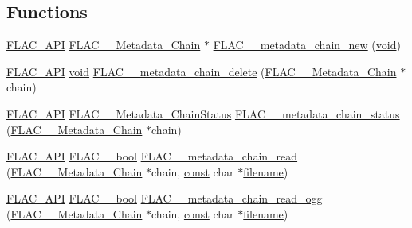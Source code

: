 \subsection*{Functions}
\begin{DoxyCompactItemize}
\item 
\hyperlink{group__flac__export_ga56ca07df8a23310707732b1c0007d6f5}{F\+L\+A\+C\+\_\+\+A\+PI} \hyperlink{struct_f_l_a_c_____metadata___chain}{F\+L\+A\+C\+\_\+\+\_\+\+Metadata\+\_\+\+Chain} $\ast$ \hyperlink{group__flac__metadata__level2_gafd1f4f58af29325b067ebc5dc34a0f69}{F\+L\+A\+C\+\_\+\+\_\+metadata\+\_\+chain\+\_\+new} (\hyperlink{sound_8c_ae35f5844602719cf66324f4de2a658b3}{void})
\item 
\hyperlink{group__flac__export_ga56ca07df8a23310707732b1c0007d6f5}{F\+L\+A\+C\+\_\+\+A\+PI} \hyperlink{sound_8c_ae35f5844602719cf66324f4de2a658b3}{void} \hyperlink{group__flac__metadata__level2_ga178898eef72ba9d569b1964fffcb4a8b}{F\+L\+A\+C\+\_\+\+\_\+metadata\+\_\+chain\+\_\+delete} (\hyperlink{struct_f_l_a_c_____metadata___chain}{F\+L\+A\+C\+\_\+\+\_\+\+Metadata\+\_\+\+Chain} $\ast$chain)
\item 
\hyperlink{group__flac__export_ga56ca07df8a23310707732b1c0007d6f5}{F\+L\+A\+C\+\_\+\+A\+PI} \hyperlink{group__flac__metadata__level2_gafe2a924893b0800b020bea8160fd4531}{F\+L\+A\+C\+\_\+\+\_\+\+Metadata\+\_\+\+Chain\+Status} \hyperlink{group__flac__metadata__level2_ga3d030e216a6517f23372bb76f0639127}{F\+L\+A\+C\+\_\+\+\_\+metadata\+\_\+chain\+\_\+status} (\hyperlink{struct_f_l_a_c_____metadata___chain}{F\+L\+A\+C\+\_\+\+\_\+\+Metadata\+\_\+\+Chain} $\ast$chain)
\item 
\hyperlink{group__flac__export_ga56ca07df8a23310707732b1c0007d6f5}{F\+L\+A\+C\+\_\+\+A\+PI} \hyperlink{ordinals_8h_a95103469f1cbd78b8cf250194985b34e}{F\+L\+A\+C\+\_\+\+\_\+bool} \hyperlink{group__flac__metadata__level2_gadb7d8e9a82aeb43e256f0a948adf5c45}{F\+L\+A\+C\+\_\+\+\_\+metadata\+\_\+chain\+\_\+read} (\hyperlink{struct_f_l_a_c_____metadata___chain}{F\+L\+A\+C\+\_\+\+\_\+\+Metadata\+\_\+\+Chain} $\ast$chain, \hyperlink{getopt1_8c_a2c212835823e3c54a8ab6d95c652660e}{const} char $\ast$\hyperlink{test__portburn_8cpp_a7efa5e9c7494c7d4586359300221aa5d}{filename})
\item 
\hyperlink{group__flac__export_ga56ca07df8a23310707732b1c0007d6f5}{F\+L\+A\+C\+\_\+\+A\+PI} \hyperlink{ordinals_8h_a95103469f1cbd78b8cf250194985b34e}{F\+L\+A\+C\+\_\+\+\_\+bool} \hyperlink{group__flac__metadata__level2_gae7b34f2929bedea0e14ac14aca253a40}{F\+L\+A\+C\+\_\+\+\_\+metadata\+\_\+chain\+\_\+read\+\_\+ogg} (\hyperlink{struct_f_l_a_c_____metadata___chain}{F\+L\+A\+C\+\_\+\+\_\+\+Metadata\+\_\+\+Chain} $\ast$chain, \hyperlink{getopt1_8c_a2c212835823e3c54a8ab6d95c652660e}{const} char $\ast$\hyperlink{test__portburn_8cpp_a7efa5e9c7494c7d4586359300221aa5d}{filename})

\end{DoxyCompactItemize}
